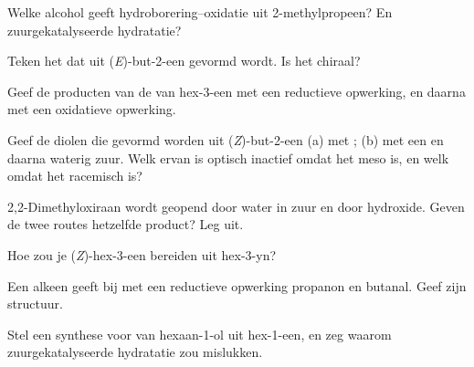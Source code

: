 \begin{exercise}[$\star$]\label{exo:b2:alkene-redox:2}
Welke alcohol geeft hydroborering--oxidatie uit 2-methylpropeen? En zuurgekatalyseerde
hydratatie?
\end{exercise}

\begin{exercise}[$\star$]\label{exo:b2:alkene-redox:3}
Teken het  dat uit (\textit{E})-but-2-een gevormd wordt. Is het chiraal?
\end{exercise}

\begin{exercise}[$\star$]\label{exo:b2:alkene-redox:4}
Geef de producten van de  van hex-3-een met een reductieve opwerking, en daarna met een
oxidatieve opwerking.
\end{exercise}

\begin{exercise}[$\star\star$]\label{exo:b2:alkene-redox:5}
Geef de diolen die gevormd worden uit (\textit{Z})-but-2-een (a) met ; (b) met een 
en daarna waterig zuur. Welk ervan is optisch inactief omdat het meso is, en welk
omdat het racemisch is?
\end{exercise}

\begin{exercise}[$\star\star$]\label{exo:b2:alkene-redox:6}
2,2-Dimethyloxiraan wordt geopend door water in zuur en door hydroxide. Geven de twee routes
hetzelfde product? Leg uit.
\end{exercise}

\begin{exercise}[$\star\star$]\label{exo:b2:alkene-redox:7}
Hoe zou je (\textit{Z})-hex-3-een bereiden uit hex-3-yn?
\end{exercise}

\begin{exercise}[$\star\star$]\label{exo:b2:alkene-redox:8}
Een alkeen  geeft bij  met een reductieve opwerking propanon en butanal.
Geef zijn structuur.
\end{exercise}

\begin{exercise}[$\star\star$]\label{exo:b2:alkene-redox:9}
Stel een synthese voor van hexaan-1-ol uit hex-1-een, en zeg waarom zuurgekatalyseerde hydratatie
zou mislukken.
\end{exercise}

